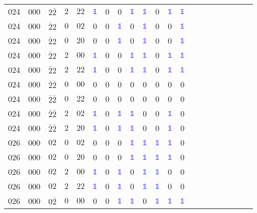 \begin{longtable*}{c| cccccccccccccccccccc }
024& 000& $2\bar{2}$& $2$& $22$& \textcolor{blue}{$\mathds{1}$}& 0& 0& \textcolor{blue}{$\mathds{1}$}& \textcolor{blue}{$\mathds{1}$}& 0& \textcolor{blue}{$\mathds{1}$}& \textcolor{blue}{$\mathds{1}$}\\
024& 000& $\bar{2}2$& $0$& $02$& 0& 0& \textcolor{blue}{$\mathds{1}$}& 0& \textcolor{blue}{$\mathds{1}$}& 0& 0& \textcolor{blue}{$\mathds{1}$}\\
024& 000& $\bar{2}2$& $0$& $20$& 0& 0& \textcolor{blue}{$\mathds{1}$}& 0& \textcolor{blue}{$\mathds{1}$}& 0& 0& \textcolor{blue}{$\mathds{1}$}\\
024& 000& $\bar{2}2$& $2$& $00$& \textcolor{blue}{$\mathds{1}$}& 0& 0& \textcolor{blue}{$\mathds{1}$}& \textcolor{blue}{$\mathds{1}$}& 0& \textcolor{blue}{$\mathds{1}$}& \textcolor{blue}{$\mathds{1}$}\\
024& 000& $\bar{2}2$& $2$& $22$& \textcolor{blue}{$\mathds{1}$}& 0& 0& \textcolor{blue}{$\mathds{1}$}& \textcolor{blue}{$\mathds{1}$}& 0& \textcolor{blue}{$\mathds{1}$}& \textcolor{blue}{$\mathds{1}$}\\
024& 000& $\bar{2}\bar{2}$& $0$& $00$& 0& 0& 0& 0& 0& 0& 0& 0\\
024& 000& $\bar{2}\bar{2}$& $0$& $22$& 0& 0& 0& 0& 0& 0& 0& 0\\
024& 000& $\bar{2}\bar{2}$& $2$& $02$& \textcolor{blue}{$\mathds{1}$}& 0& \textcolor{blue}{$\mathds{1}$}& \textcolor{blue}{$\mathds{1}$}& 0& 0& \textcolor{blue}{$\mathds{1}$}& 0\\
024& 000& $\bar{2}\bar{2}$& $2$& $20$& \textcolor{blue}{$\mathds{1}$}& 0& \textcolor{blue}{$\mathds{1}$}& \textcolor{blue}{$\mathds{1}$}& 0& 0& \textcolor{blue}{$\mathds{1}$}& 0\\
026& 000& $02$& $0$& $02$& 0& 0& 0& \textcolor{blue}{$\mathds{1}$}& \textcolor{blue}{$\mathds{1}$}& \textcolor{blue}{$\mathds{1}$}& \textcolor{blue}{$\mathds{1}$}& 0\\
026& 000& $02$& $0$& $20$& 0& 0& 0& \textcolor{blue}{$\mathds{1}$}& \textcolor{blue}{$\mathds{1}$}& \textcolor{blue}{$\mathds{1}$}& \textcolor{blue}{$\mathds{1}$}& 0\\
026& 000& $02$& $2$& $00$& \textcolor{blue}{$\mathds{1}$}& 0& \textcolor{blue}{$\mathds{1}$}& 0& \textcolor{blue}{$\mathds{1}$}& \textcolor{blue}{$\mathds{1}$}& 0& 0\\
026& 000& $02$& $2$& $22$& \textcolor{blue}{$\mathds{1}$}& 0& \textcolor{blue}{$\mathds{1}$}& 0& \textcolor{blue}{$\mathds{1}$}& \textcolor{blue}{$\mathds{1}$}& 0& 0\\
026& 000& $0\bar{2}$& $0$& $00$& 0& 0& \textcolor{blue}{$\mathds{1}$}& \textcolor{blue}{$\mathds{1}$}& 0& \textcolor{blue}{$\mathds{1}$}& \textcolor{blue}{$\mathds{1}$}& \textcolor{blue}{$\mathds{1}$}\\

\end{longtable*}
